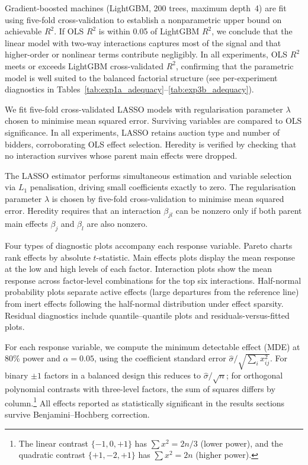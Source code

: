 Gradient-boosted machines (LightGBM, 200 trees, maximum depth~4) are fit using five-fold cross-validation to establish a nonparametric upper bound on achievable $R^2$. If OLS $R^2$ is within 0.05 of LightGBM $R^2$, we conclude that the linear model with two-way interactions captures most of the signal and that higher-order or nonlinear terms contribute negligibly. In all experiments, OLS $R^2$ meets or exceeds LightGBM cross-validated $R^2$, confirming that the parametric model is well suited to the balanced factorial structure (see per-experiment diagnostics in Tables~\ref{tab:exp1a_adequacy}--\ref{tab:exp3b_adequacy}).


We fit five-fold cross-validated LASSO models with regularisation parameter $\lambda$ chosen to minimise mean squared error. Surviving variables are compared to OLS significance. In all experiments, LASSO retains auction type and number of bidders, corroborating OLS effect selection. Heredity is verified by checking that no interaction survives whose parent main effects were dropped.

The LASSO estimator \citep{Tibshirani1996} performs simultaneous estimation and variable selection via $L_1$ penalisation, driving small coefficients exactly to zero. The regularisation parameter $\lambda$ is chosen by five-fold cross-validation to minimise mean squared error. Heredity requires that an interaction $\beta_{jl}$ can be nonzero only if both parent main effects $\beta_j$ and $\beta_l$ are also nonzero.


Four types of diagnostic plots accompany each response variable. Pareto charts rank effects by absolute $t$-statistic. Main effects plots display the mean response at the low and high levels of each factor. Interaction plots show the mean response across factor-level combinations for the top six interactions. Half-normal probability plots \citep{Daniel1959} separate active effects (large departures from the reference line) from inert effects following the half-normal distribution under effect sparsity. Residual diagnostics include quantile--quantile plots and residuals-versus-fitted plots.


For each response variable, we compute the minimum detectable effect (MDE) at 80\% power and $\alpha = 0.05$, using the coefficient standard error $\hat{\sigma} / \sqrt{\sum_i x_{ij}^2}$. For binary $\pm 1$ factors in a balanced design this reduces to $\hat{\sigma}/\sqrt{n}$; for orthogonal polynomial contrasts with three-level factors, the sum of squares differs by column.\footnote{The linear contrast $\{-1, 0, +1\}$ has $\sum x^2 = 2n/3$ (lower power), and the quadratic contrast $\{+1, -2, +1\}$ has $\sum x^2 = 2n$ (higher power).} All effects reported as statistically significant in the results sections survive Benjamini--Hochberg correction.


